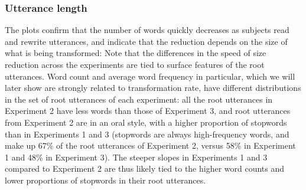 \documentclass[a4paper,fleqn]{cas-dc}
\begin{document}
\subsubsection{Utterance length}\label{utterance-length}

The plots confirm that the number of words quickly decreases as subjects
read and rewrite utterances, and indicate that the reduction depends on
the size of what is being transformed:
Note that the differences
in the speed of size reduction across the experiments are tied to
surface features of the root utterances. Word count and average word
frequency in particular, which we will later show are strongly related
to transformation rate, have different distributions in the set of root
utterances of each experiment: all the root utterances in Experiment 2
have less words than those of Experiment 3, and root utterances from
Experiment 2 are in an oral style, with a higher proportion of stopwords
than in Experiments 1 and 3 (stopwords are always high-frequency words,
and make up 67\% of the root utterances of Experiment 2, versus 58\% in
Experiment 1 and 48\% in Experiment 3). The steeper slopes in
Experiments 1 and 3 compared to Experiment 2 are thus likely tied to the higher
word counts and lower proportions of stopwords in their root utterances.
\end{document}
